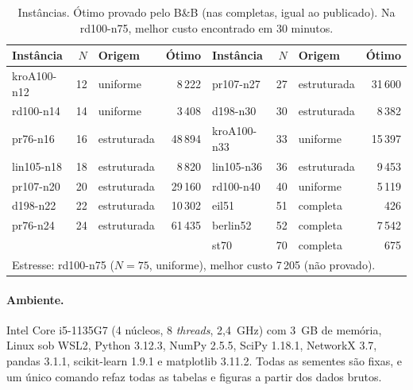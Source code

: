 \begin{table}[htb]
\centering
\caption{Instâncias. Ótimo provado pelo B\&B (nas completas, igual ao publicado). Na
rd100-n75, melhor custo encontrado em 30 minutos.}
\label{tab:instances}
\footnotesize
\begin{tabular}{lrlr@{\hspace{2.5em}}lrlr}
\toprule
Instância & $N$ & Origem & Ótimo & Instância & $N$ & Origem & Ótimo \\
\midrule
kroA100-n12 & 12 & uniforme  &  8\,222 & pr107-n27   & 27 & estruturada &  31\,600 \\
rd100-n14   & 14 & uniforme  &  3\,408 & d198-n30    & 30 & estruturada &   8\,382 \\
pr76-n16    & 16 & estruturada & 48\,894 & kroA100-n33 & 33 & uniforme &  15\,397 \\
lin105-n18  & 18 & estruturada &  8\,820 & lin105-n36  & 36 & estruturada &   9\,453 \\
pr107-n20   & 20 & estruturada & 29\,160 & rd100-n40   & 40 & uniforme &   5\,119 \\
d198-n22    & 22 & estruturada & 10\,302 & eil51       & 51 & completa &     426 \\
pr76-n24    & 24 & estruturada & 61\,435 & berlin52    & 52 & completa &   7\,542 \\
            &    &           &         & st70        & 70 & completa &     675 \\
\midrule
\multicolumn{8}{l}{Estresse: rd100-n75 ($N = 75$, uniforme), melhor custo 7\,205 (não provado).} \\
\bottomrule
\end{tabular}
\end{table}

\paragraph{Ambiente.} Intel Core i5-1135G7 (4 núcleos, 8 \emph{threads}, 2{,}4~GHz) com
3~GB de memória, Linux sob WSL2, Python 3.12.3, NumPy 2.5.5, SciPy 1.18.1, NetworkX 3.7,
pandas 3.1.1, scikit-learn 1.9.1 e matplotlib 3.11.2. Todas as sementes são fixas, e um
único comando refaz todas as tabelas e figuras a partir dos dados brutos.

